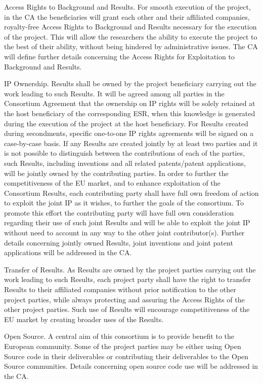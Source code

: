 \noindent \color{blue}Access Rights to Background and Results. \color{black}
For smooth execution of the project, in the CA the beneficiaries will grant each other and their affiliated companies, royalty-free Access Rights to Background and Results necessary for the execution of the project. 
This will allow the researchers the ability to execute the project to the best of their ability, without being hindered by administrative issues. 
The CA will define further details concerning the Access Rights for Exploitation to Background and Results.

\noindent \color{blue}IP Ownership. \color{black}
Results shall be owned by the project beneficiary carrying out the work leading to such Results. 
It will be agreed among all parties in the Consortium Agreement that the ownership on IP rights will be solely retained at the host beneficiary of the corresponding ESR, when this knowledge is generated during the execution of the project at the host beneficiary. 
For Results created during secondments, specific one-to-one IP rights agreements will be signed on a case-by-case basis.
If any Results are created jointly by at least two parties and it is not possible to distinguish between the contributions of each of the parties, such Results, including inventions and all related patents/patent applications, will be jointly owned by the contributing parties. 
In order to further the competitiveness of the EU market, and to enhance exploitation of the Consortium Results, each contributing party shall have full own freedom of action to exploit the joint IP as it wishes, to further the goals of the consortium. 
To promote this effort the contributing party will have full own consideration regarding their use of such joint Results and will be able to exploit the joint IP without need to account in any way to the other joint contributor(s). 
Further details concerning jointly owned Results, joint inventions and joint patent applications will be addressed in the CA.

\noindent \color{blue}Transfer of Results. \color{black}
As Results are owned by the project parties carrying out the work leading to such Results, each project party shall have the right to transfer Results to their affiliated companies without prior notification to the other project parties, while always protecting and assuring the Access Rights of the other project parties. 
Such use of Results will encourage competitiveness of the EU market by creating broader uses of the Results.

\noindent \color{blue}Open Source. \color{black} 
A central aim of this consortium is to provide benefit to the European community. Some of the project parties may be either using Open Source code in their deliverables or contributing their deliverables to the Open Source communities. 
Details concerning open source code use will be addressed in the CA.

